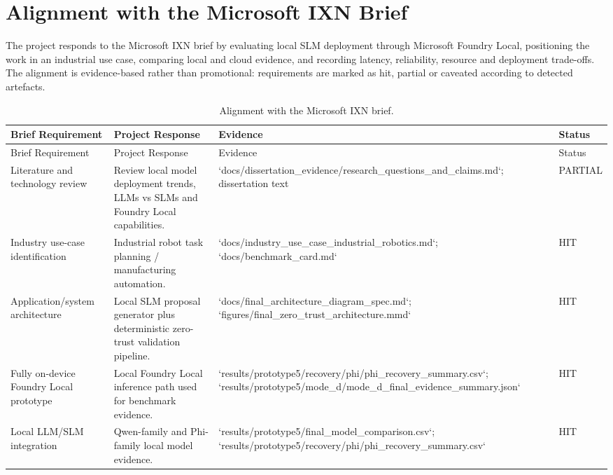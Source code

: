 \section{Alignment with the Microsoft IXN Brief}
\label{sec:microsoft_brief_alignment}

The project responds to the Microsoft IXN brief by evaluating local SLM deployment through Microsoft Foundry Local, positioning the work in an industrial use case, comparing local and cloud evidence, and recording latency, reliability, resource and deployment trade-offs. The alignment is evidence-based rather than promotional: requirements are marked as hit, partial or caveated according to detected artefacts.

\begin{longtable}{p{}p{}p{}p{}}
        \caption{Alignment with the Microsoft IXN brief.}
        \label{tab:microsoft_brief_alignment}\\
        \toprule
        Brief Requirement & Project Response & Evidence & Status \\
        \midrule
        \endfirsthead
        \toprule
        Brief Requirement & Project Response & Evidence & Status \\
        \midrule
        \endhead
        Literature and technology review & Review local model deployment trends, LLMs vs SLMs and Foundry Local capabilities. & `docs/dissertation\_evidence/research\_questions\_and\_claims.md`; dissertation text & PARTIAL \\
Industry use-case identification & Industrial robot task planning / manufacturing automation. & `docs/industry\_use\_case\_industrial\_robotics.md`; `docs/benchmark\_card.md` & HIT \\
Application/system architecture & Local SLM proposal generator plus deterministic zero-trust validation pipeline. & `docs/final\_architecture\_diagram\_spec.md`; `figures/final\_zero\_trust\_architecture.mmd` & HIT \\
Fully on-device Foundry Local prototype & Local Foundry Local inference path used for benchmark evidence. & `results/prototype5/recovery/phi/phi\_recovery\_summary.csv`; `results/prototype5/mode\_d/mode\_d\_final\_evidence\_summary.json` & HIT \\
Local LLM/SLM integration & Qwen-family and Phi-family local model evidence. & `results/prototype5/final\_model\_comparison.csv`; `results/prototype5/recovery/phi/phi\_recovery\_summary.csv` & HIT \\

\end{longtable}
